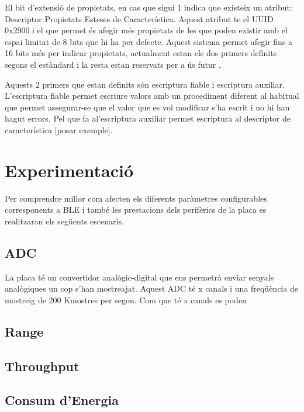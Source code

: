 El bit d'extensió de propietats, en cas que sigui 1 indica que existeix un atribut: Descriptor Propietats Esteses de Característica.
Aquest atribut te el UUID 0x2900 i el que permet és afegir més propietats de les que poden existir amb el espai limitat de 8 bits que hi ha per defecte.
Aquest sistema permet afegir fins a 16 bits més per indicar propietats, actualment estan els dos primers definits segons el estàndard i la resta estan reservats per a ús futur \cite{extended properties}.

Aquests 2 primers que estan definits són escriptura fiable i escriptura auxiliar.
L'escriptura fiable permet escriure valors amb un procediment diferent al habitual que permet assegurar-se que el valor que es vol modificar s'ha escrit i no hi han hagut errors.
Pel que fa  al'escriptura auxiliar permet escriptura al descriptor de característica [posar exemple].

\section{Experimentació}
Per comprendre millor com afecten els diferents paràmetres configurables corresponents a BLE i també les prestacions dels perifèrics de la placa es realitzaran els següents escenaris.

\subsection{ADC}
La placa té un convertidor analògic-digital que ens permetrà enviar senyals analògiques un cop s'han mostreajat.
Aquest ADC té x canals i una freqüència de mostreig de 200 Kmostres per segon.
Com que té x canals es poden 


\subsection{Range}
\subsection{Throughput}
\subsection{Consum d'Energia}